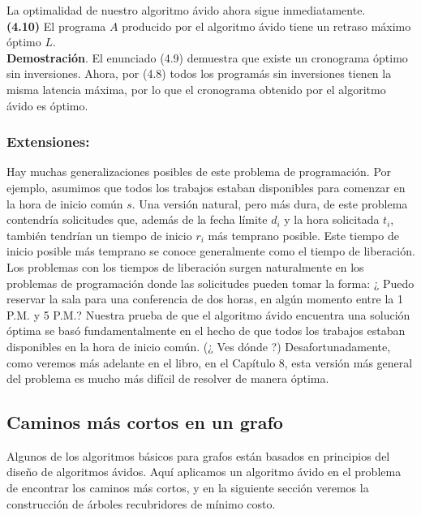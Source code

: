 \documentclass[a4paper, 12pt]{book}
\theoremstyle{dotless}
\begin{document}
La optimalidad de nuestro algoritmo ávido ahora sigue inmediatamente.\\

\textbf{(4.10)} El programa $A$ producido por el algoritmo ávido tiene un retraso máximo óptimo $L$.\\

\textbf{Demostración}. El enunciado (4.9) demuestra que existe un cronograma óptimo sin inversiones. Ahora, por (4.8) todos los programás sin inversiones tienen la misma latencia máxima, por lo que el cronograma obtenido por el algoritmo ávido es óptimo.\\

\subsubsection*{Extensiones:}
Hay muchas generalizaciones posibles de este problema de programación. Por ejemplo, asumimos que todos los trabajos estaban disponibles para comenzar en la hora de inicio común $s$. Una versión natural, pero más dura, de este problema contendría solicitudes que, además de la fecha límite $d_i$ y la hora solicitada $t_i$, también tendrían un tiempo de inicio $r_i$ más temprano posible. Este tiempo de inicio posible más temprano se conoce generalmente como el tiempo de liberación. Los problemas con los tiempos de liberación surgen naturalmente en los problemas de programación donde las solicitudes pueden tomar la forma: ¿ Puedo reservar la sala para una conferencia de dos horas, en algún momento entre la 1 P.M. y 5 P.M.? Nuestra prueba de que el algoritmo ávido encuentra una solución óptima se basó fundamentalmente en el hecho de que todos los trabajos estaban disponibles en la hora de inicio común. (¿ Ves dónde ?) Desafortunadamente, como veremos más adelante en el libro, en el Capítulo 8, esta versión más general del problema es mucho más difícil de resolver de manera óptima.\\




\subsection{Caminos más cortos en un grafo}

Algunos de los algoritmos básicos para grafos están basados en principios del diseño de algoritmos ávidos. Aquí aplicamos un algoritmo ávido en el problema de encontrar los caminos más cortos, y en la siguiente sección veremos la construcción de árboles recubridores de mínimo costo.\\\\
\end{document}
